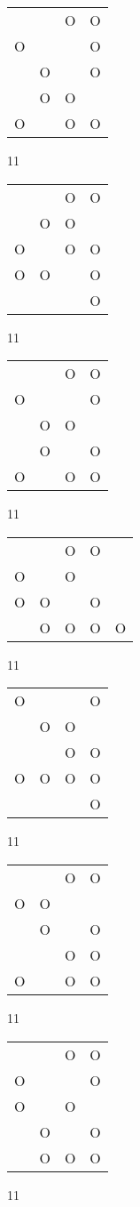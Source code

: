 \begin{tabular}{|m{0.2cm}m{0.2cm}m{0.2cm}m{0.2cm}|}\hline
 & &O&O\\
O& & &O\\
 &O& &O\\
 &O&O& \\
O& &O&O\\
\hline\end{tabular}11
\begin{tabular}{|m{0.2cm}m{0.2cm}m{0.2cm}m{0.2cm}|}\hline
 & &O&O\\
 &O&O& \\
O& &O&O\\
O&O& &O\\
 & & &O\\
\hline\end{tabular}11
\begin{tabular}{|m{0.2cm}m{0.2cm}m{0.2cm}m{0.2cm}|}\hline
 & &O&O\\
O& & &O\\
 &O&O& \\
 &O& &O\\
O& &O&O\\
\hline\end{tabular}11
\begin{tabular}{|m{0.2cm}m{0.2cm}m{0.2cm}m{0.2cm}m{0.2cm}|}\hline
 & &O&O& \\
O& &O& & \\
O&O& &O& \\
 &O&O&O&O\\
\hline\end{tabular}11
\begin{tabular}{|m{0.2cm}m{0.2cm}m{0.2cm}m{0.2cm}|}\hline
O& & &O\\
 &O&O& \\
 & &O&O\\
O&O&O&O\\
 & & &O\\
\hline\end{tabular}11
\begin{tabular}{|m{0.2cm}m{0.2cm}m{0.2cm}m{0.2cm}|}\hline
 & &O&O\\
O&O& & \\
 &O& &O\\
 & &O&O\\
O& &O&O\\
\hline\end{tabular}11
\begin{tabular}{|m{0.2cm}m{0.2cm}m{0.2cm}m{0.2cm}|}\hline
 & &O&O\\
O& & &O\\
O& &O& \\
 &O& &O\\
 &O&O&O\\
\hline\end{tabular}11
